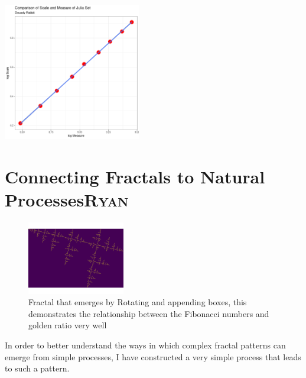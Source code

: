 \documentclass[a4paper,11pt,twoside]{article}
\begin{document}
\begin{center}
\includegraphics[width=0.45\textwidth]{media/r-ggplot-linear-reg-julia.png}
\end{center}

\section{Connecting Fractals to Natural Processes\hfill{}\textsc{Ryan}}
\label{my-fractal}
\begin{figure}
\centering
\includegraphics[width=0.38\textwidth]{../Problems/fractal-dimensions/my-self-rep-frac-GR.png}
\caption{\label{My-Frac-GR-plot}Fractal that emerges by Rotating and appending boxes, this demonstrates the relationship between the Fibonacci numbers and golden ratio very well}
\end{figure}

In order to better understand the ways in which complex fractal patterns can
emerge from simple processes, I have constructed a very simple process that
leads to such a pattern.
\end{document}
